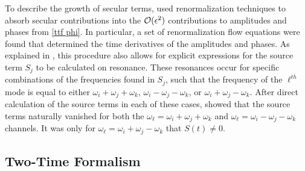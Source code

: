 \documentclass[../PhD.tex]{subfiles}
\begin{document}
To describe the growth of secular terms, \cite{1412.3249} used renormalization techniques to absorb secular contributions into the $\mathcal O(\epsilon^2)$ contributions to amplitudes and phases from \eqref{ttf phi}. In particular, a set of renormalization flow equations were found that determined the time derivatives of the amplitudes and phases. As explained in \cite{1412.3249}, this procedure also allows for explicit expressions for the source term $S_j$ to be calculated on resonance. These resonances occur for specific combinations of the frequencies found in $S_j$, such that the frequency of the $\ell^{th}$ mode is equal to either $\omega_i + \omega_j + \omega_k$, $\omega_i - \omega_j - \omega_k$, or $\omega_i + \omega_j - \omega_k$. After direct calculation of the source terms in each of these cases, \cite{1412.3249} showed that the source terms naturally vanished for both the $\omega_\ell = \omega_i + \omega_j + \omega_k$ and $\omega_\ell = \omega_i - \omega_j -\omega_k$ channels. It was only for $\omega_\ell = \omega_i + \omega_j - \omega_k$ that $S(t) \neq 0$.


\subsection{Two-Time Formalism}
\end{document}
